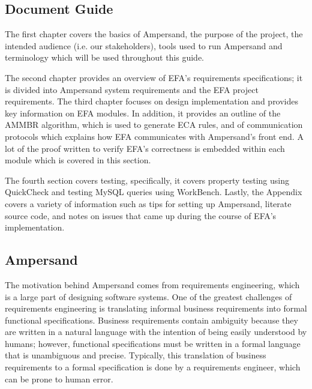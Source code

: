 \documentclass[journal,12pt,onecolumn,draftclsnofoot]{article}
\let\Oldsubsection\subsection
\renewcommand{\subsection}{\FloatBarrier\Oldsubsection}
\begin{document}
\subsection{Document Guide}

The first chapter covers 
the basics of Ampersand, the purpose of the project, the intended audience 
(i.e. our stakeholders), tools used to run Ampersand and terminology which will 
be used throughout this guide. 

The second chapter provides an overview of EFA's requirements specifications; 
it is divided into Ampersand system requirements and the EFA project 
requirements.
The third chapter focuses on design implementation and provides 
key information on EFA modules. In addition, it provides an outline of the 
AMMBR algorithm, which is used to generate ECA rules, and of
communication protocols which  explains 
how EFA communicates with Ampersand's front end.
A lot of the proof  written to 
verify EFA's correctness is embedded within each module which is covered in 
this section. 

The fourth section covers testing, specifically, it covers property testing 
using QuickCheck and testing MySQL queries using WorkBench.
Lastly, the Appendix 
covers a variety of information such as tips for setting up 
Ampersand, literate source code, and notes on issues that came up during the 
course of EFA's 
implementation. 

\subsection{Ampersand}


\indent
The motivation behind Ampersand comes from requirements engineering, which is a 
large part of designing software systems. One of the greatest challenges of 
requirements engineering is translating informal business requirements into 
formal functional specifications. Business requirements contain ambiguity 
because they are written in a natural language with the intention of being 
easily understood by humans; however,
functional specifications must be written in a formal language that is 
unambiguous and precise. Typically, this translation of business requirements 
to a formal specification is done by a requirements
engineer, which can be prone to human error.
\end{document}
